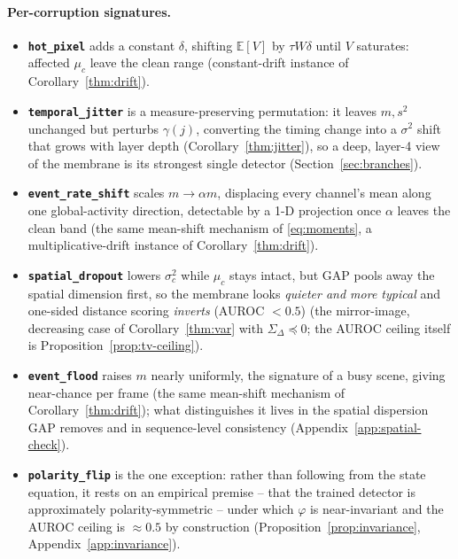 ﻿\documentclass{article} %
\theoremstyle{remark}
\begin{document}
\paragraph{Per-corruption signatures.}
\begin{itemize}[nosep,leftmargin=1.2em]
  \item \textbf{\texttt{hot\_pixel}} adds a constant $\delta$, shifting $\mathbb{E}[V]$ by
  $\tau W\delta$ until $V$ saturates: affected $\mu_c$ leave the clean range
  (constant-drift instance of Corollary~\ref{thm:drift}).
  \item \textbf{\texttt{temporal\_jitter}} is a measure-preserving permutation: it leaves
  $m,s^2$ unchanged but perturbs $\gamma(j)$, converting the timing change into a $\sigma^2$ shift
  that grows with layer depth (Corollary~\ref{thm:jitter}), so a
  deep, layer-4 view of the membrane is its strongest single detector (Section~\ref{sec:branches}).
  \item \textbf{\texttt{event\_rate\_shift}} scales $m\!\to\!\alpha m$, displacing every channel's
  mean along one global-activity direction, detectable by a 1-D projection once $\alpha$ leaves
  the clean band (the same mean-shift mechanism of \eqref{eq:moments}, a multiplicative-drift
  instance of Corollary~\ref{thm:drift}).
  \item \textbf{\texttt{spatial\_dropout}} lowers $\sigma_c^2$ while $\mu_c$ stays intact, but GAP
  pools away the spatial dimension first, so the membrane looks \emph{quieter and more typical}
  and one-sided distance scoring \emph{inverts} (AUROC $<0.5$) (the mirror-image, decreasing case
  of Corollary~\ref{thm:var} with $\Sigma_\Delta\preceq0$; the AUROC ceiling itself is
  Proposition~\ref{prop:tv-ceiling}).
  \item \textbf{\texttt{event\_flood}} raises $m$ nearly uniformly, the signature of a busy scene,
  giving near-chance per frame (the same mean-shift mechanism of Corollary~\ref{thm:drift});
  what distinguishes it lives in the spatial dispersion GAP removes and in sequence-level
  consistency (Appendix~\ref{app:spatial-check}).
  \item \textbf{\texttt{polarity\_flip}} is the one exception: rather than following from the state
  equation, it rests on an empirical premise -- that the trained detector is approximately
  polarity-symmetric -- under which $\varphi$ is near-invariant and the AUROC ceiling is
  $\approx0.5$ by construction (Proposition~\ref{prop:invariance}, Appendix~\ref{app:invariance}).
\end{itemize}
\end{document}
